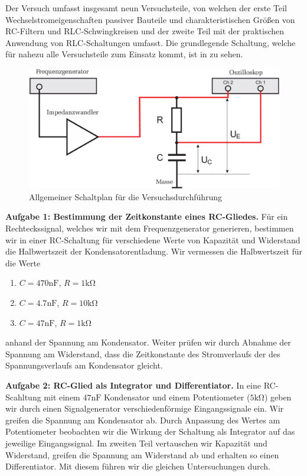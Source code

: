 Der Versuch umfasst insgesamt neun Versuchsteile, von welchen der erste Teil Wechselstromeigenschaften passiver Bauteile und charakteristischen Größen von RC-Filtern und RLC-Schwingkreisen und der zweite Teil mit der praktischen Anwendung von RLC-Schaltungen umfasst. Die grundlegende Schaltung, welche für nahezu alle Versuchsteile zum Einsatz kommt, ist in  zu sehen.

\begin{figure}[H]
  \centering
  \includegraphics[width=.70\textwidth]{files/script/schaltplan_versuchsdurchfuehrung.png}
  \caption{Allgemeiner Schaltplan für die Versuchsdurchführung}
  \label{fig:schaltplan_versuchsdurchfuehrung}
\end{figure}

\textbf{Aufgabe 1: Bestimmung der Zeitkonstante eines RC-Gliedes.} Für ein Rechteckssignal, welches wir mit dem Frequenzgenerator generieren, bestimmen wir in einer RC-Schaltung für verschiedene Werte von Kapazität und Widerstand die Halbwertszeit der Kondensatorentladung. Wir vermessen die Halbwertszeit für die Werte
\begin{enumerate}
  \item $C = 470 \si{\nano\farad}$, $R = 1 \si{\kilo\ohm}$
  \item $C = 4.7 \si{\nano\farad}$, $R = 10 \si{\kilo\ohm}$
  \item $C = 47 \si{\nano\farad}$, $R = 1 \si{\kilo\ohm}$
\end{enumerate}
anhand der Spannung am Kondensator. Weiter prüfen wir durch Abnahme der Spannung am Widerstand, dass die Zeitkonstante des Stromverlaufs der des Spannungsverlaufs am Kondensator gleicht.

\textbf{Aufgabe 2: RC-Glied als Integrator und Differentiator.} In eine RC-Scahltung mit einem $47 \si{\nano\farad}$ Kondensator und einem Potentiometer ($5\si{\kilo\ohm}$) geben wir durch einen Signalgenerator verschiedenförmige Eingangssignale ein. Wir greifen die Spannung am Kondensator ab. Durch Anpassung des Wertes am Potentiometer beobachten wir die Wirkung der Schaltung als Integrator auf das jeweilige Eingangssignal. Im zweiten Teil vertauschen wir Kapazität und Widerstand, greifen die Spannung am Widerstand ab und erhalten so einen Differentiator. Mit diesem führen wir die gleichen Untersuchungen durch.

